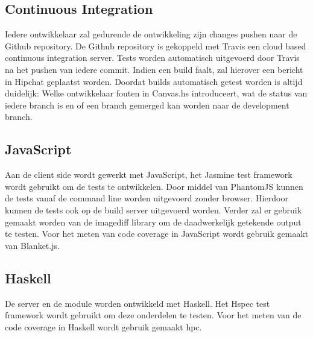 \subsection{Continuous Integration}
Iedere ontwikkelaar zal gedurende de ontwikkeling zijn changes pushen naar de Github repository. De Github repository is gekoppeld met Travis een cloud based continuous integration server. Tests worden automatisch uitgevoerd door Travis na het pushen van iedere commit. Indien een build faalt, zal hierover een bericht in Hipchat geplaatst worden. Doordat builds automatisch getest worden is altijd duidelijk: Welke ontwikkelaar fouten in Canvas.hs introduceert, wat de status van iedere branch is en of een branch gemerged kan worden naar de development branch.

\subsection{JavaScript} 
Aan de client side wordt gewerkt met JavaScript, het Jasmine test framework wordt gebruikt om de tests te ontwikkelen. Door middel van PhantomJS kunnen de tests vanaf de command line worden uitgevoerd zonder browser. Hierdoor kunnen de tests ook op de build server uitgevoerd worden. Verder zal er gebruik gemaakt worden van de imagediff library om de daadwerkelijk getekende output te testen. Voor het meten van code coverage in JavaScript wordt gebruik gemaakt van Blanket.js.

\subsection{Haskell}
De server en de module worden ontwikkeld met Haskell. Het Hspec test framework wordt gebruikt om deze onderdelen te testen. Voor het meten van de code coverage in Haskell wordt gebruik gemaakt hpc.
